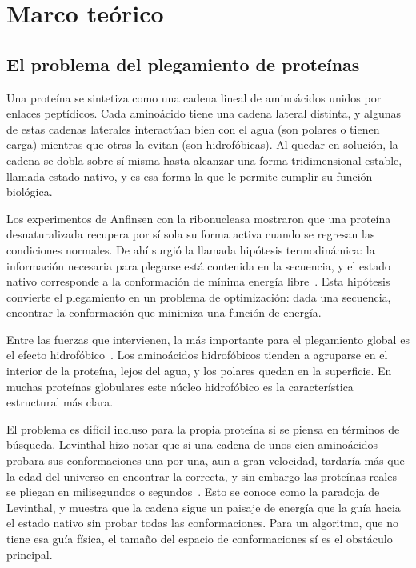 \section{Marco teórico}

\subsection{El problema del plegamiento de proteínas}
\label{sec:plegamiento}

Una proteína se sintetiza como una cadena lineal de aminoácidos unidos por enlaces peptídicos. Cada aminoácido tiene una cadena lateral distinta, y algunas de estas cadenas laterales interactúan bien con el agua (son polares o tienen carga) mientras que otras la evitan (son hidrofóbicas). Al quedar en solución, la cadena se dobla sobre sí misma hasta alcanzar una forma tridimensional estable, llamada estado nativo, y es esa forma la que le permite cumplir su función biológica.

Los experimentos de Anfinsen con la ribonucleasa mostraron que una proteína desnaturalizada recupera por sí sola su forma activa cuando se regresan las condiciones normales. De ahí surgió la llamada hipótesis termodinámica: la información necesaria para plegarse está contenida en la secuencia, y el estado nativo corresponde a la conformación de mínima energía libre~\cite{anfinsen1973principles}. Esta hipótesis convierte el plegamiento en un problema de optimización: dada una secuencia, encontrar la conformación que minimiza una función de energía.

Entre las fuerzas que intervienen, la más importante para el plegamiento global es el efecto hidrofóbico~\cite{kauzmann1959some, dill1990dominant}. Los aminoácidos hidrofóbicos tienden a agruparse en el interior de la proteína, lejos del agua, y los polares quedan en la superficie. En muchas proteínas globulares este núcleo hidrofóbico es la característica estructural más clara.

El problema es difícil incluso para la propia proteína si se piensa en términos de búsqueda. Levinthal hizo notar que si una cadena de unos cien aminoácidos probara sus conformaciones una por una, aun a gran velocidad, tardaría más que la edad del universo en encontrar la correcta, y sin embargo las proteínas reales se pliegan en milisegundos o segundos~\cite{levinthal1969fold}. Esto se conoce como la paradoja de Levinthal, y muestra que la cadena sigue un paisaje de energía que la guía hacia el estado nativo sin probar todas las conformaciones. Para un algoritmo, que no tiene esa guía física, el tamaño del espacio de conformaciones sí es el obstáculo principal.

